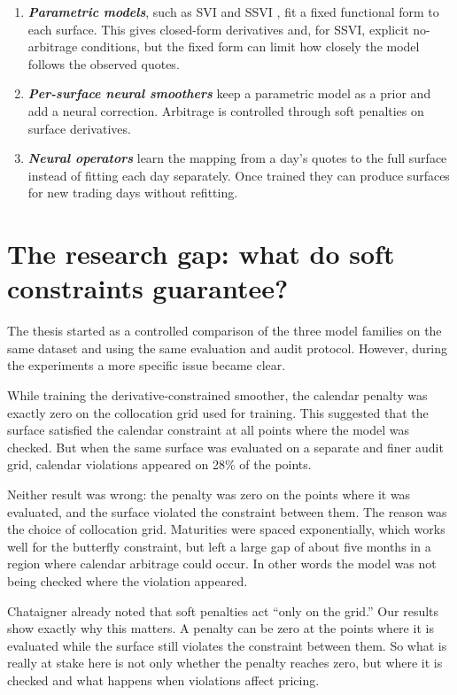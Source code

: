 \begin{enumerate}
\item \textbf{\emph{Parametric models}}, such as SVI and SSVI \cite{gatheral2004,gatheraljacquier2014}, fit a fixed functional form to each surface. This gives closed-form derivatives and, for SSVI, explicit no-arbitrage conditions, but the fixed form can limit how closely the model follows the observed quotes.

\item \textbf{\emph{Per-surface neural smoothers}} \cite{ackerer2020,hoshisashi2023} keep a parametric model as a prior and add a neural correction. Arbitrage is controlled through soft penalties on surface derivatives.

\item \textbf{\emph{Neural operators}} \cite{wiedemann2025,lu2021,kovachki2023} learn the mapping from a day's quotes to the full surface instead of fitting each day separately. Once trained they can produce surfaces for new trading days without refitting.
\end{enumerate}



\section{The research gap: what do soft constraints guarantee?}

The thesis started as a controlled comparison of the three model families on the same dataset and using the same evaluation and audit protocol. However, during the experiments a more specific issue became clear.

While training the derivative-constrained smoother, the calendar penalty was exactly zero on the collocation grid used for training. This suggested that the surface satisfied the calendar constraint at all points where the model was checked. But when the same surface was evaluated on a separate and finer audit grid, calendar violations appeared on 28\% of the points.

Neither result was wrong: the penalty was zero on the points where it was evaluated, and the surface violated the constraint between them. The reason was the choice of collocation grid. Maturities were spaced exponentially, which works well for the butterfly constraint, but left a large gap of about five months in a region where calendar arbitrage could occur. In other words the model was not being checked where the violation appeared.

Chataigner \cite{chataigner2020} already noted that soft penalties act ``only on the grid.'' Our results show exactly why this matters. A penalty can be zero at the points where it is evaluated while the surface still violates the constraint between them. So what is really at stake here is not only whether the penalty reaches zero, but where it is checked and what happens when violations affect pricing.

